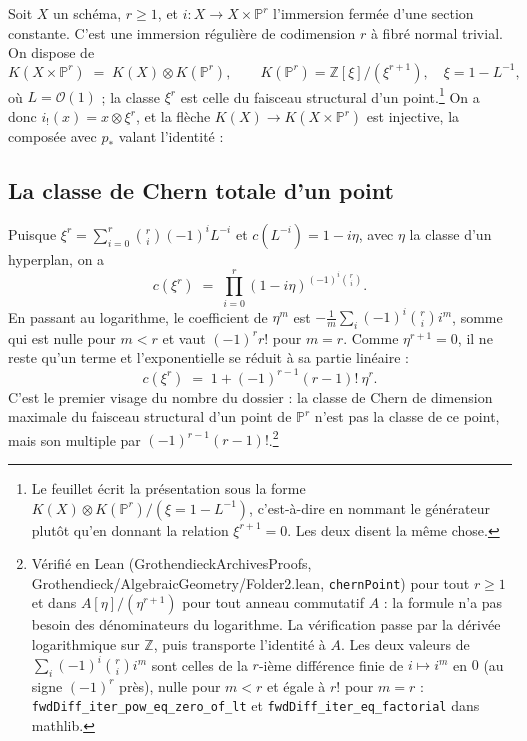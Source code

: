 \documentclass[11pt,a4paper]{article}
\begin{document}
Soit $X$ un schéma, $r \geqslant 1$, et $i : X \to X \times \mathbb{P}^{r}$
l'immersion fermée d'une section constante. C'est une immersion régulière de
codimension $r$ à fibré normal trivial. On dispose de
\[
  K(X \times \mathbb{P}^{r}) \;=\;
  K(X) \otimes K(\mathbb{P}^{r}), \qquad
  K(\mathbb{P}^{r}) = \mathbb{Z}[\xi]/(\xi^{r+1}),\quad \xi = 1 - L^{-1},
\]
où $L = \mathcal{O}(1)$ ; la classe $\xi^{r}$ est celle du faisceau structural
d'un point.\footnote{Le feuillet écrit la présentation sous la forme
$K(X) \otimes K(\mathbb{P}^{r})/(\xi = 1 - L^{-1})$, c'est-à-dire en nommant le
générateur plutôt qu'en donnant la relation $\xi^{r+1} = 0$. Les deux disent la
même chose.} On a donc $i_{!}(x) = x \otimes \xi^{r}$, et la flèche
$K(X) \to K(X \times \mathbb{P}^{r})$ est injective, la composée avec
$p_{*}$ valant l'identité :


\subsection*{La classe de Chern totale d'un point}

Puisque $\xi^{r} = \sum_{i=0}^{r} \binom{r}{i}(-1)^{i} L^{-i}$ et
$c(L^{-i}) = 1 - i\eta$, avec $\eta$ la classe d'un hyperplan, on a
\[
  c(\xi^{r}) \;=\; \prod_{i=0}^{r} (1 - i\eta)^{(-1)^{i}\binom{r}{i}} .
\]
En passant au logarithme, le coefficient de $\eta^{m}$ est
$-\frac{1}{m}\sum_{i}(-1)^{i}\binom{r}{i} i^{m}$, somme qui est nulle pour
$m < r$ et vaut $(-1)^{r} r!$ pour $m = r$. Comme $\eta^{r+1} = 0$, il ne reste
qu'un terme et l'exponentielle se réduit à sa partie linéaire :
\[
  c(\xi^{r}) \;=\; 1 + (-1)^{r-1}(r-1)!\ \eta^{r} .
\]
C'est le premier visage du nombre du dossier : la classe de Chern de dimension
maximale du faisceau structural d'un point de $\mathbb{P}^{r}$ n'est pas la
classe de ce point, mais son multiple par
$(-1)^{r-1}(r-1)!$.\footnote{Vérifié en Lean
(GrothendieckArchivesProofs, Grothendieck/AlgebraicGeometry/Folder2.lean, \texttt{chernPoint}) pour tout $r \geqslant 1$
et dans $A[\eta]/(\eta^{r+1})$ pour tout anneau commutatif $A$ : la formule
n'a pas besoin des dénominateurs du logarithme. La vérification passe par la
dérivée logarithmique sur $\mathbb{Z}$, puis transporte l'identité à $A$. Les
deux valeurs de $\sum_{i}(-1)^{i}\binom{r}{i} i^{m}$ sont celles de la
$r$-ième différence finie de $i \mapsto i^{m}$ en $0$ (au signe $(-1)^{r}$
près), nulle pour $m < r$ et égale à $r!$ pour $m = r$ :
\texttt{fwdDiff\_iter\_pow\_eq\_zero\_of\_lt} et
\texttt{fwdDiff\_iter\_eq\_factorial} dans mathlib.}
\end{document}
